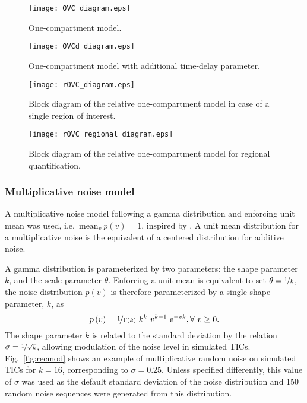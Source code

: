 \begin{subfigures}
    \begin{figure}[bh]\centering
    \texttt{[image: OVC\_diagram.eps]}
    \caption{One-compartment model.}
    \label{fig:OVC_model}
    \end{figure}
    \begin{figure}[bh]\centering
    \texttt{[image: OVCd\_diagram.eps]}
    \caption{One-compartment model with additional time-delay parameter.}
    \label{fig:OVC_model}
    \end{figure}
    \begin{figure}[bh]\centering
    \texttt{[image: rOVC\_diagram.eps]}
    \caption{Block diagram of the relative one-compartment model in case of a single region of interest.}
    \label{fig:rOVC_model}
    \end{figure}
    \begin{figure}[bh]\centering
    \texttt{[image: rOVC\_regional\_diagram.eps]}
    \caption{Block diagram of the relative one-compartment model for regional quantification.}
    \label{fig:rOVC_regional}
    \end{figure}
\end{subfigures}

\subsubsection{Multiplicative noise model}\label{sec:NoiseModel}
A multiplicative noise model following a gamma distribution and enforcing unit mean was used, i.e.~$\mathrm{mean}_v~p\left(v\right) = 1$, inspired by \citet{Barrois:2013gw}.
A unit mean distribution for a multiplicative noise is the equivalent of a centered distribution for additive noise.

A gamma distribution is parameterized by two parameters: the shape parameter $k$, and the scale parameter $\theta$.
Enforcing a unit mean is equivalent to set $\theta = \nicefrac{1}{k}$, the noise distribution $p\left(v\right)$ is therefore parameterized by a single shape parameter, $k$, as
\begin{equation}
p\left(v\right) = \nicefrac{1}{\Gamma\left(k\right)} ~ k^k ~ v^{k-1} ~ \mathrm e^{-vk}, \forall~v \geq 0.
\end{equation}
The shape parameter $k$ is related to the standard deviation by the relation $\sigma = \nicefrac{1}{\sqrt{k}}$, allowing modulation of the noise level in simulated TICs.
Fig.~\ref{fig:recmod} shows an example of multiplicative random noise on simulated TICs for $k = 16$, corresponding to $\sigma = 0.25$.
Unless specified differently, this value of $\sigma$ was used as the default standard deviation of the noise distribution and 150 random noise sequences were generated from this distribution.

